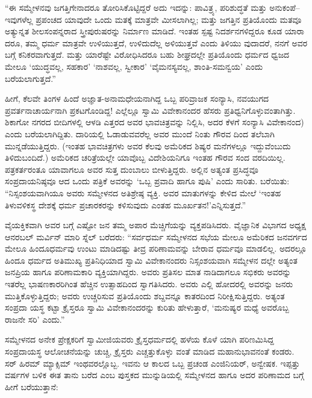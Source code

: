 “ಈ ಸಮ್ಮೇಳನವು ಜಗತ್ತಿಗೇನಾದರೂ ತೋರಿಸಿಕೊಟ್ಟಿದ್ದರೆ ಅದು ಇದನ್ನು: ಪಾವಿತ್ರ್ಯ, ಪರಿಶುದ್ಧತೆ ಮತ್ತು ಅನುಕಂಪೆ–ಇವುಗಳೆಲ್ಲ ಪ್ರಪಂಚದ ಯಾವುದೇ ಒಂದು ಮತಕ್ಕೆ ಮಾತ್ರವೇ ಮೀಸಲಾಗಿಲ್ಲ; ಮತ್ತು ಜಗತ್ತಿನ ಪ್ರತಿಯೊಂದು ಮತವೂ ಅತ್ಯುನ್ನತ ಶೀಲಸಂಪನ್ನರಾದ ಸ್ತ್ರೀಪುರುಷರನ್ನು ನಿರ್ಮಾಣ ಮಾಡಿದೆ. ಇಂತಹ ಸ್ಪಷ್ಟ ನಿದರ್ಶನಗಳಿದ್ದರೂ ಕೂಡ ಯಾರಾ ದರೂ, ತಮ್ಮ ಧರ್ಮ ಮಾತ್ರವೇ ಉಳಿಯುತ್ತದೆ, ಉಳಿದುದೆಲ್ಲ ಅಳಿಯುತ್ತವೆ ಎಂದು ತಿಳಿಯು ವುದಾದರೆ, ನನಗೆ ಅವರ ಬಗ್ಗೆ ಕನಿಕರವಾಗುತ್ತದೆ. ಮತ್ತು ಯಾರೆಷ್ಟೇ ವಿರೋಧಿಸಿದರೂ ಬಹು ಶೀಘ್ರದಲ್ಲೇ ಪ್ರತಿಯೊಂದು ಧರ್ಮದ ಧ್ವಜದ ಮೇಲೂ ‘ಯುದ್ಧವಲ್ಲ, ಸಹಕಾರ’ ‘ನಾಶವಲ್ಲ, ಸ್ವೀಕಾರ’ ‘ವೈಮನಸ್ಯವಲ್ಲ, ಶಾಂತಿ-ಸಮನ್ವಯ’ ಎಂದು ಬರೆಯಲಾಗುತ್ತದೆ.”

ಹೀಗೆ, ಕೆಲವೇ ತಿಂಗಳ ಹಿಂದೆ ಅಜ್ಞಾತ-ಅನಾಮಧೇಯನಾಗಿದ್ದ ಒಬ್ಬ ಪರಿವ್ರಾಜಕ ಸಂನ್ಯಾಸಿ, ನವಯುಗದ ಪ್ರವರ್ತನಾಚಾರ್ಯನಾಗಿ ಪ್ರಕಟಗೊಂಡಿದ್ದ! ಎಲ್ಲೆಲ್ಲೂ ಸ್ವಾಮಿ ವಿವೇಕಾನಂದರ ಹೆಸರು ಪ್ರತಿಧ್ವನಿಗೊಳ್ಳುವಂತಾಗಿತ್ತು. ಶಿಕಾಗೋ ನಗರದ ಬೀದಿಗಳಲ್ಲಿ ಆಳಡಿ ಎತ್ತರದ ಅವರ ಭಾವಚಿತ್ರವನ್ನು ನಿಲ್ಲಿಸಿ, ಅದರ ಕೆಳಗೆ ಸಂನ್ಯಾಸಿ ವಿವೇಕಾನಂದ) ಎಂದು ಬರೆಯಲಾಗಿದ್ದಿತು. ದಾರಿಯಲ್ಲಿ ಓಡಾಡುವವರೆಲ್ಲ ಅವರ ಮುಂದೆ ನಿಂತು ಗೌರವ ದಿಂದ ತಲೆಬಾಗಿ ಮುನ್ನಡೆಯುತ್ತಿದ್ದರು. (ಇಂತಹ ಭಾವಚಿತ್ರಗಳು ಅವರ ಕೆಲವು ಅಮೆರಿಕದ ಶಿಷ್ಯರ ಮನೆಗಳಲ್ಲೂ ಇದ್ದುವೆಂಬುದು ತಿಳಿದುಬಂದಿದೆ.) ಅಮೆರಿಕದ ಚರಿತ್ರೆಯಲ್ಲೇ ಯಾವೊಬ್ಬ ವಿದೇಶಿಯನಿಗೂ ಇಂತಹ ಗೌರವ ಸಂದ ವರದಿಯಿಲ್ಲ. ಪತ್ರಕರ್ತರಂತೂ ಯಾವಾಗಲೂ ಅವರ ಸುತ್ತ ದುಂಬಾಲು ಬೀಳುತ್ತಿದ್ದರು. ಅಲ್ಲಿನ ಅತ್ಯಂತ ಪ್ರಸಿದ್ಧವೂ ಸಂಪ್ರದಾಯನಿಷ್ಠವೂ ಆದ ಒಂದು ಪತ್ರಿಕೆ ಅವರನ್ನು ‘ಒಬ್ಬ ಪ್ರವಾದಿ ಹಾಗೂ ಪುಷಿ’ ಎಂದು ಸಾರಿತು.  ಬರೆಯಿತು: “ನಿಸ್ಸಂಶಯವಾಗಿಯೂ ಅವರು ಸಮ್ಮೇಳನದ ಅತಿಶ್ರೇಷ್ಠ ವ್ಯಕ್ತಿ. ಅವರ ಮಾತುಗಳನ್ನು ಕೇಳಿದ ಮೇಲೆ ‘ಇಂತಹ ತಿಳುವಳಿಕಸ್ಥ ದೇಶಕ್ಕೆ ಧರ್ಮ ಪ್ರಚಾರಕರನ್ನು ಕಳಿಸುವುದು ಎಂತಹ ಮೂರ್ಖತನ!’ಎನ್ನಿಸುತ್ತದೆ.”

ವೈಯಕ್ತಿಕವಾಗಿ ಅವರ ಬಗ್ಗೆ ಎಷ್ಟೋ ಜನ ತಮ್ಮ ಅಪಾರ ಮೆಚ್ಚಿಗೆಯನ್ನು ವ್ಯಕ್ತಪಡಿಸಿದರು. ವೈಜ್ಞಾನಿಕ ವಿಭಾಗದ ಅಧ್ಯಕ್ಷ ಆನರಬಲ್ ಮರ್ವಿನ್ ಮಾರಿ ಸ್ನೆಲ್ ಬರೆದರು: “ಸರ್ವಧರ್ಮ ಸಮ್ಮೇಳನದ ಸಭೆಯ ಮೇಲೂ ಅಮೆರಿಕದ ಜನವರ್ಗದ ಮೇಲೂ ಹಿಂದೂಧರ್ಮವು ಉಂಟು ಮಾಡಿದಷ್ಟು ತೀವ್ರ ಪರಿಣಾಮವನ್ನು ಬೇರಾವ ಧರ್ಮವೂ ಮಾಡಲಿಲ್ಲ. ಅದರಲ್ಲೂ ಹಿಂದೂ ಧರ್ಮದ ಅತಿಮುಖ್ಯ ಪ್ರತಿನಿಧಿಯಾದ ಸ್ವಾಮಿ ವಿವೇಕಾನಂದರು ನಿಸ್ಸಂಶಯವಾಗಿ ಸಮ್ಮೇಳನ ದಲ್ಲೇ ಅತ್ಯಂತ ಜನಪ್ರಿಯ ಹಾಗೂ ಪರಿಣಾಮಕಾರಿ ವ್ಯಕ್ತಿಯಾಗಿದ್ದರು. ಅವರು ಪ್ರತಿಸಲ ಮಾತ ನಾಡಿದಾಗಲೂ ಸಭಿಕರು ಅವರನ್ನು ಇತರೆಲ್ಲ ಭಾಷಣಕಾರರಿಗಿಂತ ಹೆಚ್ಚಿನ ಉತ್ಸಾಹದಿಂದ ಸ್ವಾಗತಿಸಿದರು. ಅವರು ಎಲ್ಲಿ ಹೋದರಲ್ಲಿ ಅವರನ್ನು ಜನರು ಮುತ್ತಿಕೊಳ್ಳುತ್ತಿದ್ದರು; ಅವರು ಉಚ್ಚರಿಸುವ ಪ್ರತಿಯೊಂದು ಶಬ್ದವನ್ನೂ ಕಾತರದಿಂದ ನಿರೀಕ್ಷಿಸುತ್ತಿದ್ದರು. ಅತ್ಯಂತ ಸಂಪ್ರದಾ ಯಸ್ಥ ಕಟ್ಟಾ ಕ್ರೈಸ್ತರೂ ಸ್ವಾಮಿ ವಿವೇಕಾನಂದರನ್ನು ಕುರಿತು ಹೇಳುತ್ತಾರೆ, ‘ಮನುಷ್ಯರ ಮಧ್ಯೆ ಅವರೊಬ್ಬ ರಾಜನೇ ಸರಿ’ ಎಂದು.”

ಸಮ್ಮೇಳನದ ಅನೇಕ ಪ್ರೇಕ್ಷಕರಿಗೆ ಸ್ವಾಮೀಜಿಯವರು ಕ್ರೈಸ್ತಧರ್ಮದಲ್ಲಿ ಹಳೆಯ ಕೊಳೆ ಯಾಗಿ ಪರಿಣಮಿಸಿದ್ದ ಸಂಪ್ರದಾಯಸ್ಥ ಆಲೋಚನೆಯನ್ನು ಚುಚ್ಚಿ, ಕ್ರೈಸ್ತರು ಎಚ್ಚತ್ತುಕೊಳ್ಳು ವಂತೆ ಮಾಡಿದ ಮಹಾನುಭಾವನಂತೆ ಕಂಡರು. ಸರ್ ಹಿರಮ್ ಮ್ಯಾಕ್ಸಿಮ್ ಇಂಥವರಲ್ಲೊಬ್ಬ. ಇವನು ಆ ಕಾಲದ ಒಬ್ಬ ಪ್ರಚಂಡ ಎಂಜಿನಿಯರ್, ಅನ್ವೇಷಕ. ಇಪ್ಪತ್ತು ವರ್ಷಗಳ ಬಳಿಕ ಈತ ತಾನು ಬರೆದ  ಎಂಬ ಪುಸ್ತಕದ ಮುನ್ನುಡಿಯಲ್ಲಿ ಸಮ್ಮೇಳನದ ಹಾಗೂ ಅದರ ಪರಿಣಾಮದ ಬಗ್ಗೆ ಹೀಗೆ ಬರೆಯುತ್ತಾನೆ:

